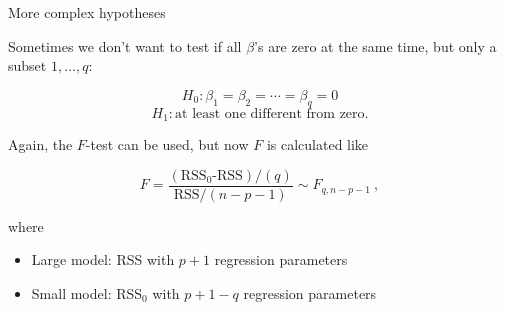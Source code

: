 \documentclass[
  10pt,
  ignorenonframetext,
]{beamer}
\providecommand{\tightlist}{%
  \setlength{\itemsep}{0pt}\setlength{\parskip}{0pt}}
\begin{document}
\begin{frame}
\begin{block}{More complex hypotheses}
\protect\hypertarget{more-complex-hypotheses}{}
\(~\)

Sometimes we don't want to test if all \(\beta\)'s are zero at the same
time, but only a subset \(1,\ldots , q\):

\[ H_0: \beta_1=\beta_2=\cdots= \beta_q =0\] 
\[H_1: \text{at least one different from zero}.\]

\vspace{2mm}

Again, the \(F\)-test can be used, but now \(F\) is calculated like

\[F=\frac{(\text{RSS$_0$-RSS})/(q)}{\text{RSS}/(n-p-1)} \sim F_{q,n-p-1} \ ,\]

where

\begin{itemize}
\tightlist
\item
  Large model: RSS with \(p+1\) regression parameters
\item
  Small model: RSS\(_0\) with \(p+1-q\) regression parameters
\end{itemize}
\end{block}
\end{frame}
\end{document}
